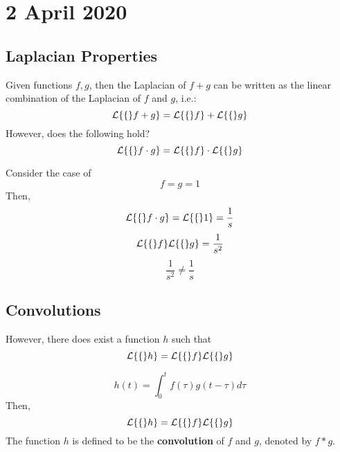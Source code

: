 \documentclass[diffeq.tex]{subfiles}
\begin{document}
\chapter{2 April 2020}
    \section{Laplacian Properties}
    Given functions $f, g$, then the Laplacian of $f + g$ can be written as the linear combination of the Laplacian of $f$ and $g$, i.e.:
    \begin{equation}
        \mathcal{L}\{\{\}f + g\} = \mathcal{L}\{\{\}f\} + \mathcal{L}\{\{\}g\}
    \end{equation}
    However, does the following hold?
    \begin{equation}
        \mathcal{L}\{\{\}f \cdot g\} = \mathcal{L}\{\{\}f\} \cdot \mathcal{L}\{\{\}g\}
    \end{equation}
    \begin{example}
        Consider the case of
        \begin{equation}
            f = g = 1
        \end{equation}
        Then,
        \begin{equation}
            \mathcal{L}\{\{\}f \cdot g\} = \mathcal{L}\{\{\}1\} = \frac{1}{s}
        \end{equation}
        \begin{equation}
            \mathcal{L}\{\{\}f\}\mathcal{L}\{\{\}g\} = \frac{1}{s^{2}}
        \end{equation}
        \begin{equation}
            \frac{1}{s^{2}} \neq \frac{1}{s}
        \end{equation}
    \end{example}
    \np
    \section{Convolutions}
    However, there does exist a function $h$ such that
    \begin{equation}
        \mathcal{L}\{\{\}h\} = \mathcal{L}\{\{\}f\}\mathcal{L}\{\{\}g\}
    \end{equation}
    \begin{theorem}
        \begin{equation}
            h(t) = \int_{0}^{t}f(\tau)g(t - \tau)d\tau
        \end{equation}
        Then,
        \begin{equation}
            \mathcal{L}\{\{\}h\} = \mathcal{L}\{\{\}f\}\mathcal{L}\{\{\}g\}
        \end{equation}
        The function $h$ is defined to be the \textbf{convolution} of $f$ and $g$, denoted by $f * g$.
    \end{theorem}
\end{document}
